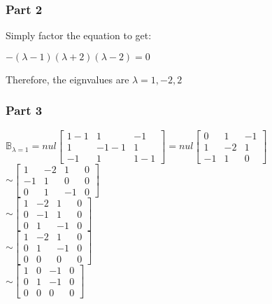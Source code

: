 \documentclass{report}
\begin{document}
\subsubsection*{Part 2}
Simply factor the equation to get:
\begin{center}
    $-(\lambda-1)(\lambda+2)(\lambda-2)=0$
\end{center}
Therefore, the eignvalues are $\lambda = 1, -2, 2$
\subsubsection*{Part 3}
\begin{center}
$\mathbb{B}_{\lambda=1}=
nul\begin{bmatrix}
    1-1 & 1 & -1 \\ 
    1 & -1-1 & 1 \\ 
    -1 & 1 & 1-1
\end{bmatrix}=
nul\begin{bmatrix}
    0 & 1 & -1 \\ 
    1 & -2 & 1 \\ 
    -1 & 1 & 0
\end{bmatrix}$\\\vspace{3mm}
$\sim \begin{bmatrix}
    1 & -2 & 1 & 0 \\ 
    -1 & 1 & 0 & 0 \\
    0 & 1 & -1 & 0 
\end{bmatrix}$\\\vspace{3mm}
$\sim \begin{bmatrix}
    1 & -2 & 1 & 0 \\ 
    0 & -1 & 1 & 0 \\
    0 & 1 & -1 & 0 
\end{bmatrix}$\\\vspace{3mm}
$\sim \begin{bmatrix}
    1 & -2 & 1 & 0 \\ 
    0 & 1 & -1 & 0 \\
    0 & 0 & 0 & 0 
\end{bmatrix}$\\\vspace{3mm}
$\sim \begin{bmatrix}
    1 & 0 & -1 & 0 \\ 
    0 & 1 & -1 & 0 \\
    0 & 0 & 0 & 0 
\end{bmatrix}$\\\vspace{3mm}

\end{center}
\end{document}
